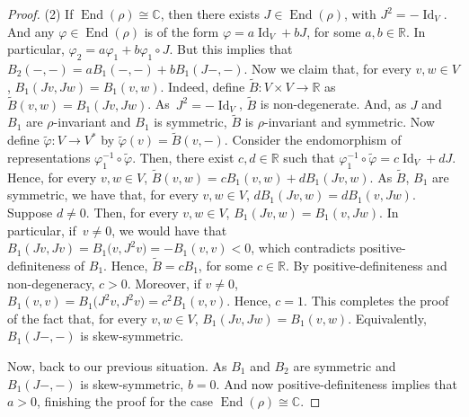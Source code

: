 \documentclass[pdftex]{sigma}
\numberwithin{equation}{section}
\DeclareMathOperator{\Id}{Id}
\DeclareMathOperator{\End}{End}
\begin{document}
\begin{proof}
(2) If $\End(\rho) \cong \mathbb{C}$, then there exists $J\in \End(\rho)$, with $J^2 = -\Id_V$. And any $\varphi \in \End(\rho)$ is of the form $\varphi = a \Id_V + b J$, for some $a,b\in\mathbb{R}$. In particular, $\varphi_2 = a \varphi_1 + b \varphi_1 \circ J$. But this implies that $B_2(-,-) = a B_1(-,-) + b B_1 (J-,-)$. Now we claim that, for every $v,w\in V$, $B_1(Jv,Jw)=B_1(v,w)$. Indeed, define $\tilde{B} \colon V \times V \to \mathbb{R}$ as $\tilde{B}(v,w) = B_1 (Jv,Jw)$. As~${J^2 = -\Id_V}$, $\tilde{B}$ is non-degenerate. And, as $J$ and $B_1$ are $\rho$-invariant and $B_1$ is symmetric, $\tilde{B}$ is $\rho$-invariant and symmetric. Now define $\tilde{\varphi} \colon V \to V^{*}$ by $\tilde{\varphi} (v) = \tilde{B}(v,-)$. Consider the endomorphism of representations $\varphi_{1}^{-1} \circ \tilde{\varphi}$. Then, there exist $c,d \in \mathbb{R}$ such that $\varphi_{1}^{-1} \circ \tilde{\varphi}=c \Id_V + d J$. Hence, for every ${v,w \in V}$, $\tilde{B}(v,w) = c B_1(v,w) + d B_1(Jv,w)$. As $\tilde{B}$, $B_1$ are symmetric, we have that, for every $v,w \in V$, $dB_1(Jv,w) = dB_1(v,Jw)$. Suppose $d \neq 0$. Then, for every $v,w \in V$, $B_1(Jv,w) = B_1(v,Jw)$. In particular, if~${v \neq 0}$, we would have that $B_1(Jv,Jv) = B_1\bigl(v,J^2v\bigr) = -B_1(v,v) < 0$, which contradicts positive-definiteness of $B_1$. Hence, $\tilde{B} = c B_1$, for some $c \in \mathbb{R}$. By positive-definiteness and non-degeneracy, $c > 0$. Moreover, if $v \neq 0$, $B_1(v,v)=B_1\bigl(J^2v,J^2v\bigr) = c^2 B_1(v,v)$. Hence, $c=1$. This completes the proof of the fact that, for every $v,w\in V$, $B_1(Jv,Jw) = B_1(v,w)$. Equivalently, $B_1(J-,-)$ is skew-symmetric.
				
				Now, back to our previous situation. As $B_1$ and $B_2$ are symmetric and $B_1(J-,-)$ is skew-symmetric, $b=0$. And now positive-definiteness implies that $a > 0$, finishing the proof for the case $\End(\rho) \cong \mathbb{C}$.
				

\end{proof}
\end{document}
